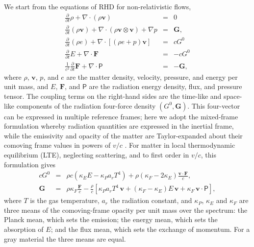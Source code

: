 \documentclass[preprint,12pt,authoryear]{elsarticle}
\newcommand{\vecv}{\mathbf{v}}
\newcommand{\vecG}{\mathbf{G}}
\newcommand{\vecF}{\mathbf{F}}
\newcommand{\tenP}{\mathsf{P}}
\begin{document}
We start from the equations of RHD for non-relativistic flows,
\begin{eqnarray}
\frac{\partial}{\partial t}\rho + \nabla \cdot \left(\rho\vecv\right) & = & 0 \\
\frac{\partial}{\partial t}\left(\rho \vecv\right) + \nabla\cdot\left(\rho \vecv\otimes\vecv\right) + \nabla p & = & \vecG, \\
\frac{\partial}{\partial t}\left(\rho e\right) +  \nabla \cdot\left[\left(\rho e + p\right)\vecv\right]  & = & c G^0 \\
\frac{\partial}{\partial t}E + \nabla \cdot \vecF & = & -c G^0 \\
\frac{1}{c^2}\frac{\partial}{\partial t}\vecF + \nabla \cdot \tenP & = & -\vecG ,
\end{eqnarray}
where $\rho$, $\vecv$, $p$, and $e$ are the matter density, velocity, pressure, and energy per unit mass, and $E$, $\vecF$, and $\tenP$ are the radiation energy density, flux, and pressure tensor. The coupling terms on the right-hand sides are the time-like and space-like components of the radiation four-force density $(G^0, \vecG)$. This four-vector can be expressed in multiple reference frames; here we adopt the mixed-frame formulation whereby radiation quantities are expressed in the inertial frame, while the emissivity and opacity of the matter are Taylor-expanded about their comoving frame values in powers of $v/c$ \citep{Mihalas99a, Lowrie99a, Mihalas01a, Krumholz07b}. For matter in local thermodynamic equilibrium (LTE), neglecting scattering, and to first order in $v/c$, this formulation gives
\begin{eqnarray}
cG^0 & = & \rho c\left(\kappa_E E - \kappa_P a_r T^4\right) + \rho\left(\kappa_F - 2\kappa_E\right)\frac{\vecv\cdot\vecF}{c},
\label{eq:G0_int}
\\
\vecG & = & \rho\kappa_F\frac{\vecF}{c} - \frac{\rho}{c}\left[\kappa_P a_r T^4\,\vecv + \left(\kappa_F - \kappa_E\right)E\,\vecv + \kappa_F\,\vecv\cdot\tenP\right],
\label{eq:G_int}
\end{eqnarray}
where $T$ is the gas temperature, $a_r$ the radiation constant, and $\kappa_P$, $\kappa_E$ and $\kappa_F$ are three means of the comoving-frame opacity per unit mass over the spectrum: the Planck mean, which sets the emission; the energy mean, which sets the absorption of $E$; and the flux mean, which sets the exchange of momentum. For a gray material the three means are equal.
\end{document}

